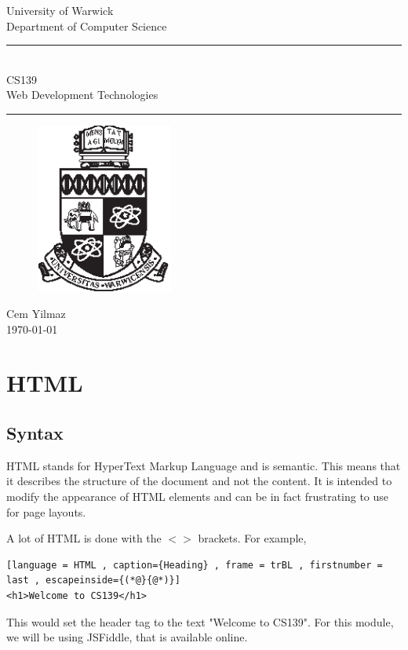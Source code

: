 \documentclass[a4paper]{article}
\theoremstyle{plain}
\theoremstyle{definition}
\theoremstyle{remark}
\begin{document}
	\begin{titlepage}
	\begin{center}
	\large
	University of Warwick \\
	Department of Computer Science \\
	\huge
	\vspace{50mm}
	\rule{\linewidth}{0.5pt} \\
	CS139 \\
	\vspace{5mm}
	\Large
	Web Development Technologies
	\rule{\linewidth}{0.5pt}
	\vspace{5mm}
	\begin{figure}[H]
	\centering
	\includegraphics[width=0.4\textwidth]{crest.eps}
	\end{figure}
	\vspace{37mm}
	Cem Yilmaz \\
	\today
	\end{center}
	\end{titlepage}
	\newpage
\section{HTML}
\subsection{Syntax}
HTML stands for HyperText Markup Language and is semantic. This means that it describes the structure of the document and not the content. It is intended to modify the appearance of HTML elements and can be in fact frustrating to use for page layouts.

A lot of HTML is done with the $<>$ brackets. For example,
\begin{lstlisting}[language = HTML , caption={Heading} , frame = trBL , firstnumber = last , escapeinside={(*@}{@*)}]
<h1>Welcome to CS139</h1>
\end{lstlisting}
This would set the header tag to the text "Welcome to CS139". For this module, we will be using JSFiddle, that is available online.
\end{document}
